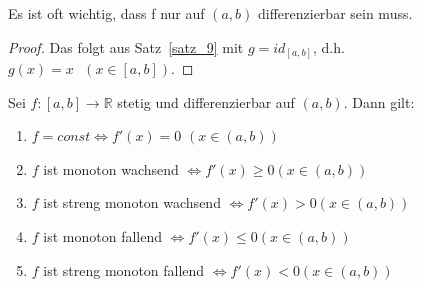 \begin{Bemerkung}{
	 Es ist oft wichtig, dass f nur auf $(a,b)$ differenzierbar 
	sein muss.
}\end{Bemerkung}

\begin{proof}
	Das folgt aus Satz~\ref{satz_9}
	mit $g = id_{[a,b]}$, d.h. $g(x) = x \textbf{ } (x \in [a,b])$.
\end{proof}


\begin{Satz}{
	\label{satz_11}
	Sei $f:[a,b] \rightarrow \mathbb{R}$ stetig und differenzierbar auf $(a,b)$. 
	Dann gilt:
	\renewcommand{\labelenumi}{\alph{enumi})}
	\begin{enumerate}
		\item $f = const \Leftrightarrow f'(x) = 0$ $(x\in(a,b))$
		\item $f$ ist monoton wachsend $\Leftrightarrow f'(x) \geq 0 (x \in (a,b))$
		\item $f$ ist streng monoton wachsend $\Leftrightarrow f'(x) > 0 (x \in (a,b
		))$
		\item $f$ ist monoton fallend $\Leftrightarrow f'(x) \leq 0 (x \in (a,b))$
		\item $f$ ist streng monoton fallend $\Leftrightarrow f'(x) < 0 
		(x \in (a,b))$ 
	\end{enumerate}
}\end{Satz}

